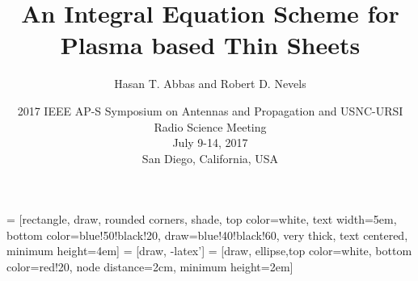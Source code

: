 \documentclass[mathserif,16pt,xcolor=table]{beamer}
\title{An Integral Equation Scheme for Plasma based Thin Sheets}
\author[Abbas and Nevels]{Hasan T. Abbas and Robert D. Nevels}
\institute{Electromagnetics \& Microwave Laboratory\\[\medskipamount] \pgfuseimage{tamuecenbig}}
\date[July 12, 2017]{2017 IEEE AP-S Symposium on Antennas and Propagation and USNC-URSI Radio Science Meeting\\
July 9-14, 2017\\
San Diego, California, USA}
\begin{document}
\preto\subequations{\ifhmode\unskip\fi}

 = [rectangle, draw, rounded corners, shade, top color=white, text width=5em,
bottom color=blue!50!black!20, draw=blue!40!black!60, very thick, text centered, minimum height=4em]
 = [draw, -latex']
 = [draw, ellipse,top color=white, bottom color=red!20, node distance=2cm, minimum height=2em]

\beamertemplateballitem

\frame{\titlepage}


%
%
\end{document}
